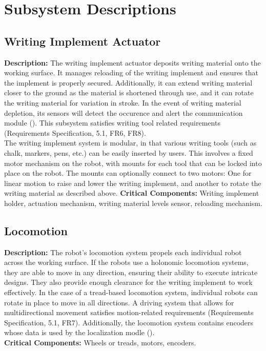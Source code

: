 
\section{Subsystem Descriptions}
\label{sec:subsystem_descriptions}

\subsection{Writing Implement Actuator}
\label{sec:subsystem_writing_implement_actuator}
\textbf{Description:} The writing implement actuator deposits writing material onto the working surface. It manages reloading of the writing implement and ensures that the implement is properly secured. Additionally, it can extend writing material closer to the ground as the material is shortened through use, and it can rotate the writing material for variation in stroke. In the event of writing material depletion, its sensors will detect the occurence and alert the communication module (). This subsystem satisfies writing tool related requirements (Requirements Specification, 5.1, FR6, FR8).\\
The writing implement system is modular, in that various writing tools (such as chalk, markers, pens, etc.) can be easily inserted by users. This involves a fixed motor mechanism on the robot, with mounts for each tool that can be locked into place on the robot. The mounts can optionally connect to two motors: One for linear motion to raise and lower the writing implement, and another to rotate the writing material as described above.
\textbf{Critical Components:} Writing implement holder, actuation mechanism, writing material levels sensor, reloading mechanism.\\

\subsection{Locomotion}
\label{sec:subsystem_locomotion}
\textbf{Description:} The robot's locomotion system propels each individual robot across the working surface. If the robots use a holonomic locomotion systems, they are able to move in any direction, ensuring their ability to execute intricate designs. They also provide enough clearance for the writing implement to work effectively. In the case of a tread-based locomotion system, individual robots can rotate in place to move in all directions. A driving system that allows for multidirectional movement satisfies motion-related requirements (Requirements Specification, 5.1, FR7). Additionally, the locomotion system contains encoders whose data is used by the localization modle ().\\
\textbf{Critical Components:} Wheels or treads, motors, encoders.\\

